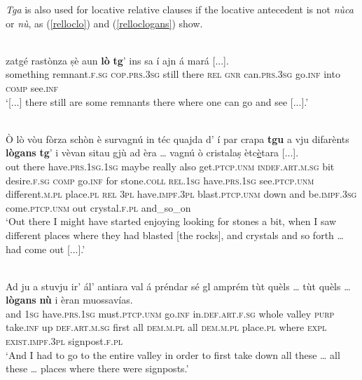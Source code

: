 \textit{Tga} is also used for locative relative clauses if the locative antecedent is not \textit{nùca} or \textit{nù}, as (\ref{relloclo}) and (\ref{relloclogans}) show.

\ea
\label{relloclo}
\\
\gll [...] zatgé rastònza ṣè aun \textbf{lò} \textbf{tg}’ ins sa í ajn á mará [...].\\
 {} something remnant.\textsc{f.sg} \textsc{cop.prs.3sg} still there \textsc{rel} \textsc{gnr} can.\textsc{prs.3sg} go.\textsc{inf} into \textsc{comp} see.\textsc{inf}\\
\glt `[...] there still are some remnants there where one can go and see [...].'
\z

\ea
\label{relloclogans}
\\
\gll  Ò lò vòu fòrza schòn è survagnú in téc quajda d' í par crapa \textbf{tgu} a vju difarènts \textbf{lògans} \textbf{tg}’ i vèvan sitau gjù ad èra … vagnú ò cristalaṣ ètc\underline{è}tara [...].   \\
out there  have.\textsc{prs.1sg.1sg} maybe really also get.\textsc{ptcp.unm} \textsc{indef.art.m.sg} bit desire.\textsc{f.sg} \textsc{comp} go.\textsc{inf} for stone.\textsc{coll} \textsc{rel.1sg} have.\textsc{prs.1sg} see.\textsc{ptcp.unm} different.\textsc{m.pl} place.\textsc{pl} \textsc{rel} \textsc{3pl} have.\textsc{impf.3pl} blast.\textsc{ptcp.unm} down and  be.\textsc{impf.3sg} {} come.\textsc{ptcp.unm} out crystal.\textsc{f.pl} and\_so\_on \\
\glt `Out there I might have started enjoying looking for stones a bit, when I saw different places where they had blasted [the rocks], and crystals and so forth … had come out [...].'
\z

\ea
\label{}
\\
\gll Ad ju a stuvju ir’ ál’ antiara val á préndar sé gl amprém tùt quèls … tùt quèls … \textbf{lògans} \textbf{nù} i èran muossavías.\\
and \textsc{1sg} have.\textsc{prs.1sg} must.\textsc{ptcp.unm} go.\textsc{inf} in.\textsc{def.art.f.sg} whole valley \textsc{purp} take.\textsc{inf} up \textsc{def.art.m.sg} first all \textsc{dem.m.pl} {} all \textsc{dem.m.pl} {} place.\textsc{pl} where \textsc{expl} \textsc{exist.impf.3pl} signpost.\textsc{f.pl}\\
\glt `And I had to go to the entire valley in order to first take down all these … all these … places where there were signposts.'
\z

